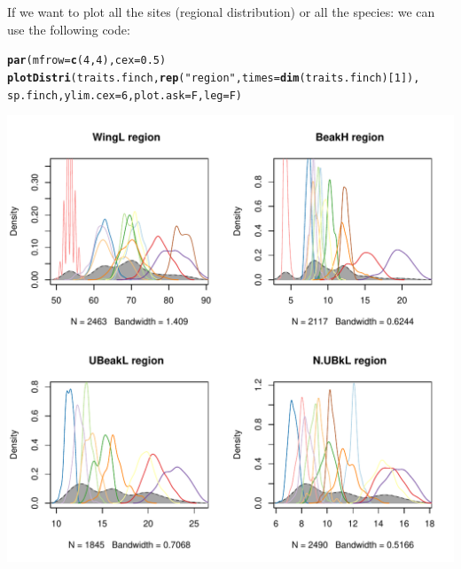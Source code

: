 \documentclass[12pt]{article}\usepackage[]{graphicx}\usepackage[]{color}
\makeatletter
\def\maxwidth{ %
  \ifdim\Gin@nat@width>\linewidth
    \linewidth
  \else
    \Gin@nat@width
  \fi
}
\newcommand{\hlnum}[1]{\textcolor[rgb]{0.686,0.059,0.569}{#1}}%
\newcommand{\hlstr}[1]{\textcolor[rgb]{0.192,0.494,0.8}{#1}}%
\newcommand{\hlstd}[1]{\textcolor[rgb]{0.345,0.345,0.345}{#1}}%
\newcommand{\hlkwc}[1]{\textcolor[rgb]{0.333,0.667,0.333}{#1}}%
\newcommand{\hlkwd}[1]{\textcolor[rgb]{0.737,0.353,0.396}{\textbf{#1}}}%
\newenvironment{kframe}{%
 \def\at@end@of@kframe{}%
 \ifinner\ifhmode%
  \def\at@end@of@kframe{\end{minipage}}%
  \begin{minipage}{\columnwidth}%
 \fi\fi%
 \def\FrameCommand##1{\hskip\@totalleftmargin \hskip-\fboxsep
 \colorbox{shadecolor}{##1}\hskip-\fboxsep
     \hskip-\linewidth \hskip-\@totalleftmargin \hskip\columnwidth}%
 \MakeFramed {\advance\hsize-\width
   \@totalleftmargin\z@ \linewidth\hsize
   \@setminipage}}%
 {\par\unskip\endMakeFramed%
 \at@end@of@kframe}
\newenvironment{knitrout}{}{} %
\makeatother
\begin{document}
If we want to plot all the sites (regional distribution) or all the species: we can use the following code:
\begin{knitrout}
\color{fgcolor}\begin{kframe}
\begin{alltt}
\hlkwd{par}\hlstd{(}\hlkwc{mfrow} \hlstd{=} \hlkwd{c}\hlstd{(}\hlnum{4}\hlstd{,}\hlnum{4}\hlstd{),} \hlkwc{cex} \hlstd{=} \hlnum{0.5}\hlstd{)}
\hlkwd{plotDistri}\hlstd{(traits.finch,} \hlkwd{rep}\hlstd{(}\hlstr{"region"}\hlstd{,} \hlkwc{times} \hlstd{=} \hlkwd{dim}\hlstd{(traits.finch)[}\hlnum{1}\hlstd{]),}
     \hlstd{sp.finch,} \hlkwc{ylim.cex} \hlstd{=} \hlnum{6}\hlstd{,} \hlkwc{plot.ask} \hlstd{= F,} \hlkwc{leg} \hlstd{= F)}
\end{alltt}
\end{kframe}
\includegraphics[width=\maxwidth]{figure/unnamed-chunk-13} 

\end{knitrout}
\end{document}
